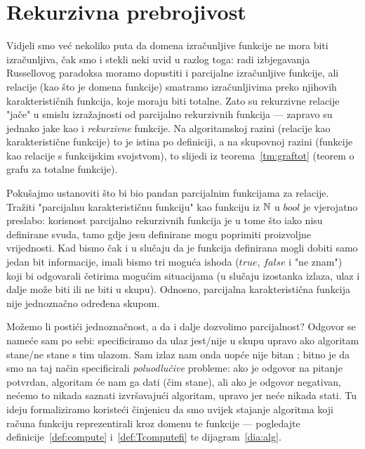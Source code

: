 \chapter{Rekurzivna prebrojivost}\label{ch:re}


Vidjeli smo već nekoliko puta da domena izračunljive funkcije ne mora biti izračunljiva, čak smo i stekli neki uvid u razlog toga: radi izbjegavanja Russellovog paradoksa moramo dopustiti i parcijalne izračunljive funkcije, ali relacije (kao što je domena funkcije) smatramo izračunljivima preko njihovih karakterističnih funkcija, koje moraju biti totalne. Zato su rekurzivne relacije "jače" u smislu izražajnosti od parcijalno rekurzivnih funkcija --- zapravo su jednako jake kao i \emph{rekurzivne} funkcije. Na algoritamskoj razini (relacije kao karakteristične funkcije) to je istina po definiciji, a na skupovnoj razini (funkcije kao relacije s funkcijskim svojstvom), to slijedi iz teorema~\ref{tm:graftot} (teorem o grafu za totalne funkcije).

Pokušajmo ustanoviti što bi bio pandan parcijalnim funkcijama za relacije. Tražiti "parcijalnu karakterističnu funkciju" kao funkciju iz ${\mathbb N}$ u $bool$ je vjerojatno preslabo: korisnost parcijalno rekurzivnih funkcija je u tome što iako nisu definirane svuda, tamo gdje jesu definirane mogu poprimiti proizvoljne vrijednosti. Kad bismo čak i u slučaju da je funkcija definirana mogli dobiti samo jedan bit informacije, imali bismo tri moguća ishoda ($\mathit{true}$, $\mathit{false}$ i "ne znam") koji bi odgovarali četirima mogućim situacijama (u slučaju izostanka izlaza, ulaz i dalje može biti ili ne biti u skupu). Odnosno, parcijalna karakteristična funkcija nije jednoznačno određena skupom.

Možemo li postići jednoznačnost, a da i dalje dozvolimo parcijalnost? Odgovor se nameće sam po sebi: specificiramo da ulaz jest\slash nije u skupu upravo ako algoritam stane\slash ne stane s tim ulazom. Sam izlaz nam onda uopće nije bitan%
; bitno je da smo na taj način specificirali \emph{poluodlučive} probleme: ako je odgovor na pitanje potvrdan, algoritam će nam ga dati (čim stane), ali ako je odgovor negativan, nećemo to nikada saznati izvršavajući algoritam, upravo jer neće nikada stati. Tu ideju formaliziramo koristeći činjenicu da smo uvijek stajanje algoritma koji računa funkciju reprezentirali kroz domenu te funkcije --- pogledajte definicije~\ref{def:compute} i~\ref{def:Tcomputefi} te dijagram~\eqref{dia:alg}.


